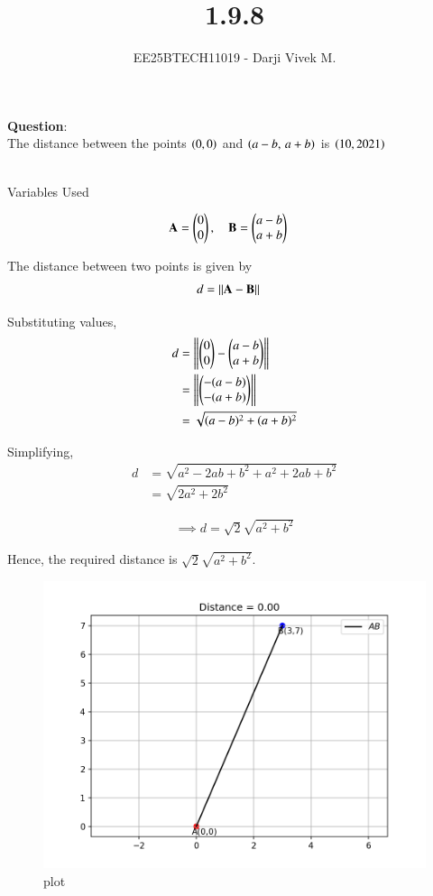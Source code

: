 \documentclass[journal]{IEEEtran}
\begin{document}


\title{1.9.8}
\author{EE25BTECH11019 - Darji Vivek M.}
{\let\newpage\relax\maketitle}

\renewcommand{\thefigure}{\theenumi}
\renewcommand{\thetable}{\theenumi}
\setlength{\intextsep}{10pt}

\renewcommand{\thetable}{\theenumi}

\textbf{Question}:\\
The distance between the points $\left(0,0\right)$ and $\left(a-b,\,a+b\right)$ is \underline{\hspace{2cm}} \hfill $\left(10,2021\right)$
\\

\solution \\

\begin{table}[h!]    
  \centering
  
  \caption{Variables Used}
  \label{tab10.5.8.1}
\end{table}

\begin{align}
\mathbf{A} &= \begin{pmatrix}0\\0\end{pmatrix}, \quad 
\mathbf{B} = \begin{pmatrix}a-b\\a+b\end{pmatrix}
\end{align}

The distance between two points is given by
\begin{align}
d &= \left\lVert\mathbf{A}-\mathbf{B}\right\rVert
\end{align}

Substituting values,
\begin{align}
d &= \left\lVert\begin{pmatrix}0\\0\end{pmatrix}-\begin{pmatrix}a-b\\a+b\end{pmatrix}\right\rVert \\
  &= \left\lVert\begin{pmatrix}-(a-b)\\-(a+b)\end{pmatrix}\right\rVert \\
  &= \sqrt{(a-b)^2 + (a+b)^2}
\end{align}

Simplifying,
\begin{align}
d &= \sqrt{a^2 - 2ab + b^2 + a^2 + 2ab + b^2} \\
  &= \sqrt{2a^2 + 2b^2}
\end{align}

\begin{align}
\implies d = \sqrt{2}\sqrt{a^2+b^2}
\end{align}

Hence, the required distance is $\boxed{\sqrt{2}\sqrt{a^2+b^2}}$.
\begin{figure}[H]
\centering
\includegraphics[width=0.75\columnwidth]{figs/2.png}
\caption{\centering plot}
\label{fig:placeholder_125}
\end{figure}
\end{document}
